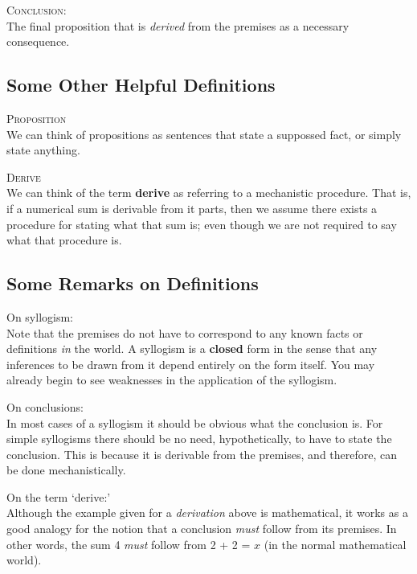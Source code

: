 \documentclass{article}
\begin{document}
\begin{definition}\label{conclusion}
\textsc{Conclusion}:\\
The final proposition that is \textsl{derived} from the premises as a necessary consequence.
\end{definition}


\subsection{Some Other Helpful Definitions}
\begin{definition}
\textsc{Proposition}\\
We can think of propositions as sentences that state a suppossed fact, or simply state anything.
\end{definition}

\begin{definition}
\textsc{Derive}\\
We can think of the term \textbf{derive} as referring to a mechanistic procedure. That is, if a numerical sum is derivable from it parts, then we assume there exists a procedure for stating what that sum is; even though we are not required to say what that procedure is.
\end{definition}



\subsection{Some Remarks on Definitions}
\begin{remark} On syllogism:\\
Note that the premises do not have to correspond to any known facts or definitions \textsl{in} the world. A syllogism is a \textbf{closed} form in the sense that any inferences to be drawn from it depend entirely on the form itself. You may already begin to see weaknesses in the application of the syllogism.
\end{remark}

\begin{remark} On conclusions:\\
In most cases of a syllogism it should be obvious what the conclusion is. For simple syllogisms there should be no need, hypothetically, to have to state the conclusion. This is because it is derivable from the premises, and therefore, can be done mechanistically.
\end{remark} 

\begin{remark} On the term `derive:'\\
Although the example given for a \textsl{derivation} above is mathematical, it works as a good analogy for the notion that a conclusion \textsl{must} follow from its premises. In other words, the sum 4 \textsl{must} follow from 2 + 2 = $x$ (in the normal mathematical world).
\end{remark} 
\end{document}
